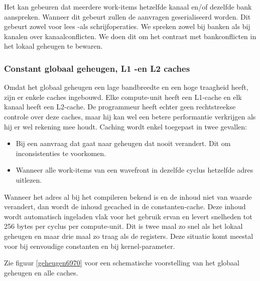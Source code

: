 Het kan gebeuren dat meerdere work-items hetzelfde kanaal en/of dezelfde bank aanspreken. Wanneer dit gebeurt zullen de aanvragen geserialiseerd worden. Dit gebeurt zowel voor lees -als schrijfoperaties. We spreken zowel bij banken als bij kanalen over kanaalconflicten. We doen dit om het contrast met bankconflicten in het lokaal geheugen te bewaren.




\subsubsection{Constant globaal geheugen, L1 -en L2 caches}
Omdat het globaal geheugen een lage bandbreedte en een hoge traagheid heeft, zijn er enkele caches ingebouwd. Elke compute-unit heeft een L1-cache en elk kanaal heeft een L2-cache. De programmeur heeft echter geen rechtstreekse controle over deze caches, maar hij kan wel een betere performantie verkrijgen als hij er wel rekening mee houdt. Caching wordt enkel toegepast in twee gevallen:
\begin{itemize}
    \item Bij een aanvraag dat gaat naar geheugen dat nooit verandert. Dit om inconsistenties te voorkomen.
    \item Wanneer alle work-items van een wavefront in dezelfde cyclus hetzelfde adres uitlezen.
\end{itemize} 

Wanneer het adres al bij het compileren bekend is en de inhoud niet van waarde verandert, dan wordt de inhoud gecached in de constanten-cache. Deze inhoud wordt automatisch ingeladen vlak voor het gebruik ervan en levert snelheden tot 256 bytes per cyclus per compute-unit. Dit is twee maal zo snel als het lokaal geheugen en maar drie maal zo traag als de registers. Deze situatie komt meestal voor bij eenvoudige constanten en bij kernel-parameter.

Zie figuur \ref{geheugen6970} voor een schematische voorstelling van het globaal geheugen en alle caches.

